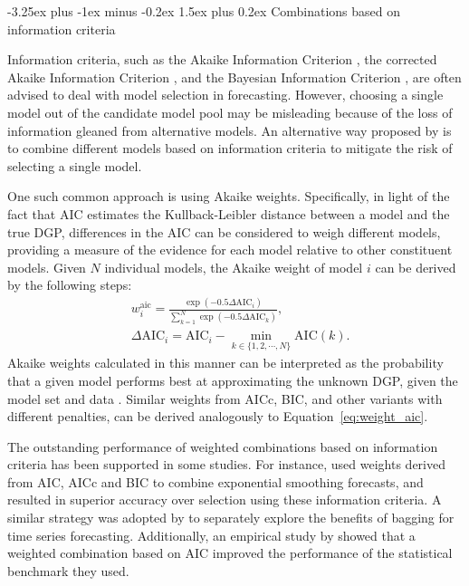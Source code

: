 \documentclass[11pt]{article}
\makeatletter
\renewcommand{\paragraph}{\@startsection{paragraph}{4}{0ex}%
   {-3.25ex plus -1ex minus -0.2ex}%
   {1.5ex plus 0.2ex}%
   {\normalfont\normalsize\bfseries}}
\makeatother
\begin{document}
\paragraph{Combinations based on information criteria}

Information criteria, such as the Akaike Information Criterion \citep[AIC,][]{Akaike1974-ya}, the corrected Akaike Information Criterion \citep[AICc,][]{Sugiura1978-xm}, and the Bayesian Information Criterion \citep[BIC,][]{Schwarz1978-cz}, are often advised to deal with model selection in forecasting. However, choosing a single model out of the candidate model pool may be misleading because of the loss of information gleaned from alternative models. An alternative way proposed by \cite{Burnham2002-us} is to combine different models based on information criteria to mitigate the risk of selecting a single model.

One such common approach is using Akaike weights. Specifically, in light of the fact that AIC estimates the Kullback-Leibler distance \citep{Kullback1951-hl} between a model and the true DGP, differences in the AIC can be considered to weigh different models, providing a measure of the evidence for each model relative to other constituent models. Given $N$ individual models, the Akaike weight of model $i$ can be derived by the following steps:
\begin{align}
&w_{i}^{\text{aic}}=\frac{\exp (-0.5 \Delta \mathrm{AIC}_{i})}{\sum_{k=1}^{N} \exp \left(-0.5 \Delta \mathrm{AIC}_{k}\right)}, \label{eq:weight_aic} \\
&\Delta \mathrm{AIC}_{i}=\mathrm{AIC}_{i}-\min _{k \in \{1,2,\cdots,N\}} \mathrm{AIC}(k). \nonumber
\end{align}
Akaike weights calculated in this manner can be interpreted as the probability that a given model performs best at approximating the unknown DGP, given the model set and data \citep{Kolassa2011-ai}. Similar weights from AICc, BIC, and other variants with different penalties, can be derived analogously to Equation~\eqref{eq:weight_aic}.

The outstanding performance of weighted combinations based on information criteria has been supported in some studies. For instance, \cite{Kolassa2011-ai} used weights derived from AIC, AICc and BIC to combine exponential smoothing forecasts, and resulted in superior accuracy over selection using these information criteria. A similar strategy was adopted by \cite{Petropoulos2018-fw} to separately explore the benefits of bagging for time series forecasting. Additionally, an empirical study by \cite{Petropoulos2018-ad} showed that a weighted combination based on AIC improved the performance of the statistical benchmark they used.
\end{document}
